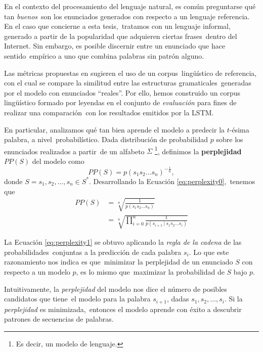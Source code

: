 \noindent
En el contexto del procesamiento del lenguaje natural, es común preguntarse qué tan \emph{buenos}\
son los enunciados generados con respecto a un lenguaje referencia. En el caso que concierne a esta tesis,\
tratamos con un lenguaje informal, generado a partir de la popularidad que adquieren ciertas frases\
dentro del Internet. Sin embargo, es posible discernir entre un enunciado que hace sentido\
empírico a uno que combina palabras sin patrón alguno.\par
Las métricas propuestas en \cite{DBLP:journals/corr/VinyalsTBE16} sugieren el uso de un corpus\
lingüístico de referencia, con el cual se compare la similitud entre las estructuras gramaticales\
generadas por el modelo con enunciados ``reales''. Por ello, hemos construido un corpus lingüístico
formado por leyendas en el conjunto de \emph{evaluación} para fines de realizar una comparación\
con los resultados emitidos por la LSTM.\par
En particular, analizamos qué tan bien aprende el modelo a predecir la $t$-ésima palabra, a nivel\
probabilístico. Dada distribución de probabilidad $p$ sobre los enunciados realizados a partir\
de un alfabeto $\Sigma$%
\footnote{
  Es decir, un modelo de lenguaje.
}, definimos la \textbf{perplejidad} $PP(S)$ del modelo como
\begin{equation}
  PP(S) = p(s_1 s_2 \ldots s_n) ^{-\frac{1}{n}}, \label{eq:perplexity0}
\end{equation}
donde $S = s_1, s_2, \ldots, s_n \in S^*$. Desarrollando la Ecuación \ref{eq:perplexity0},\
tenemos que
\begin{align}
  PP(S) &= \sqrt[n]{\frac{1}{p(s_1 s_2 \ldots s_n)}}\\
  &= \sqrt[n]{\prod_{i=0}^n \frac{1}{p(s_{i+1}\ |\ s_1 s_2 \ldots s_i)}} \label{eq:perplexity1}
\end{align}\par
La Ecuación \ref{eq:perplexity1} se obtuvo aplicando la \emph{regla de la cadena} de las probabilidades\
conjuntas a la predicción de cada palabra $s_i$. Lo que este razonamiento nos indica es que\
minimizar la perplejidad de un enunciado $S$ con respecto a un modelo $p$, es lo mismo que\
maximizar la probabilidad de $S$ bajo $p$.\par
Intuitivamente, la \emph{perplejidad} del modelo nos dice el número de posibles candidatos que tiene\
el modelo para la palabra $s_{i+1}$, dadas $s_1, s_2, \ldots, s_i$. Si la \emph{perplejidad} es minimizada,\
entonces el modelo aprende con éxito a descubrir patrones de secuencias de palabras.\par
